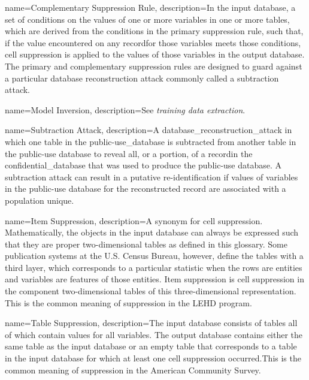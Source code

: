 {
    name=Complementary Suppression Rule,
    description={In the input database, a set of conditions on the values of one or more variables in one or more tables, which are derived from the conditions in the primary suppression rule, such that, if the value encountered on any \gls{record}for those variables meets those conditions, cell suppression is applied to the values of those variables in the output database. The primary and complementary suppression rules are designed to guard against a particular database reconstruction attack commonly called a subtraction attack.}
}

{
    name=Model Inversion,
    description={See \textit{training data extraction}.}
}

{
    name=Subtraction Attack,
    description={A \gls{database_reconstruction_attack} in which one table in the \gls{public-use_database} is subtracted from another table in the public-use database to reveal all, or a portion, of a \gls{record}in the \gls{confidential_database} that was used to produce the public-use database. A subtraction attack can result in a putative re-identification if values of variables in the public-use database for the reconstructed record are associated with a population unique.}
}

{
    name=Item Suppression,
    description={A synonym for cell suppression. Mathematically, the objects in the input database can always be expressed such that they are proper two-dimensional tables as defined in this glossary. Some publication systems at the U.S. Census Bureau, however, define the tables with a third layer, which corresponds to a particular statistic when the rows are entities and variables are features of those entities. Item suppression is cell suppression in the component two-dimensional tables of this three-dimensional representation. This is the common meaning of suppression in the LEHD program.}
}

{
    name=Table Suppression,
    description={The input database consists of tables all of which contain values for all variables. The output database contains either the same table as the input database or an empty table that corresponds to a table in the input database for which at least one cell suppression occurred.This is the common meaning of suppression in the American Community Survey.}
}



